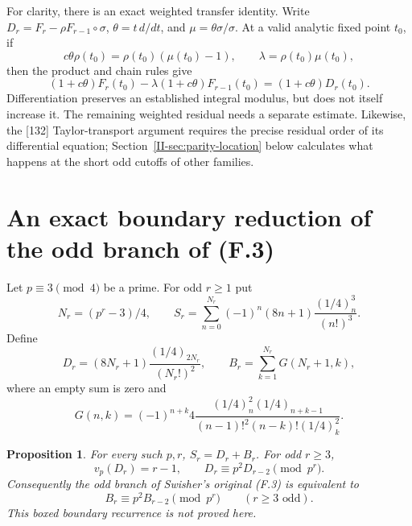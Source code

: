 \documentclass[11pt,letterpaper]{article}
\newtheorem{proposition}[theorem]{Proposition}
\numberwithin{equation}{section}
\begin{document}
For clarity, there is an exact weighted transfer identity.
Write $D_r=F_r-\rho F_{r-1}\circ\sigma$,
$\theta=t\,d/dt$, and $\mu=\theta\sigma/\sigma$.
At a valid analytic fixed point $t_0$, if
\[
 c\theta\rho(t_0)=\rho(t_0)(\mu(t_0)-1),\qquad
 \lambda=\rho(t_0)\mu(t_0),
\]
then the product and chain rules give
\[
 (1+c\theta)F_r(t_0)-\lambda(1+c\theta)F_{r-1}(t_0)
 =(1+c\theta)D_r(t_0).
\]
Differentiation preserves an established integral modulus, but does
not itself increase it. The remaining weighted residual needs a
separate estimate. Likewise, the [132] Taylor-transport argument
requires the precise residual order of its differential equation;
Section~\ref{II-sec:parity-location} below calculates what happens at
the short odd cutoffs of other families.


\section{An exact boundary reduction of the odd branch of (F.3)}\label{loc-II-6}
Let $p\equiv3\pmod4$ be a prime. For odd $r\ge1$ put
\[
 N_r=(p^r-3)/4,\qquad
 S_r=\sum_{n=0}^{N_r}(-1)^n(8n+1)\frac{(1/4)_n^3}{(n!)^3}.
\]
Define
\[
 D_r=(8N_r+1)\frac{(1/4)_{2N_r}}{(N_r!)^2},\qquad
 B_r=\sum_{k=1}^{N_r}G(N_r+1,k),
\]
where an empty sum is zero and
\[
 G(n,k)=(-1)^{n+k}4
 \frac{(1/4)_n^2(1/4)_{n+k-1}}
 {(n-1)!^2(n-k)!(1/4)_k^2}.
\]
\begin{proposition}
For every such $p,r$, $S_r=D_r+B_r$. For odd $r\ge3$,
\[
 v_p(D_r)=r-1,\qquad D_r\equiv p^2D_{r-2}\pmod{p^r}.
\]
Consequently the odd branch of Swisher's original (F.3) is equivalent to
\[
 \boxed{B_r\equiv p^2B_{r-2}\pmod{p^r}}\qquad(r\ge3\text{ odd}).
\]
This boxed boundary recurrence is not proved here.
\end{proposition}
\end{document}
